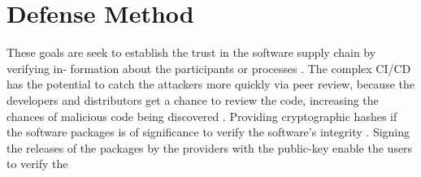\section{Defense Method}

These goals are seek to establish the trust in the software supply chain by verifying in-
formation about the participants or processes \cite{melara2022software}.
The complex CI/CD has the potential to catch the attackers more quickly via peer review, 
because the developers and distributors get a chance to review the code, increasing
the chances of malicious code being discovered \cite{levy2003poisoning}.
Providing cryptographic hashes if the software packages is of significance to
verify the software's integrity \cite{levy2003poisoning}.
Signing the releases of the packages by the providers with the public-key enable the 
users to verify the 


